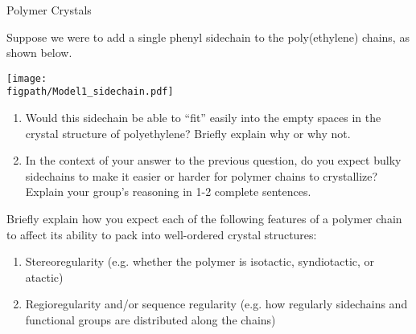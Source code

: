 \begin{activity}{Polymer Crystals}
\begin{infobox}
\end{infobox}

\begin{ctqs}
	
	\question Suppose we were to add a single phenyl sidechain to the poly(ethylene) chains, as shown below.

	\vspace{6pt}
	\centerline{\texttt{[image: \\figpath/Model1\_sidechain.pdf]}}	
	
		\begin{enumerate}
		
			\item Would this sidechain be able to ``fit'' easily into the empty spaces in the crystal structure of polyethylene?  Briefly explain why or why not.
	
		\begin{solution}[0.5in]
		\end{solution}
			
			\item In the context of your answer to the previous question, do you expect bulky sidechains to make it easier or harder for polymer chains to crystallize?  Explain your group's reasoning in 1-2 complete sentences.
	
		\begin{solution}[1.25in]
		\end{solution}
			
		\end{enumerate}
	
	\question Briefly explain how you expect each of the following features of a polymer chain to affect its ability to pack into well-ordered crystal structures:
	
		\begin{enumerate}
		
			\item Stereoregularity (e.g. whether the polymer is isotactic, syndiotactic, or atactic)
	
		\begin{solution}[0.75in]
		\end{solution}
			
			\item Regioregularity and/or sequence regularity (e.g. how regularly sidechains and functional groups are distributed along the chains)
	
		\begin{solution}[0.75in]
		\end{solution}
			

\end{enumerate}
\end{ctqs}
\end{activity}
